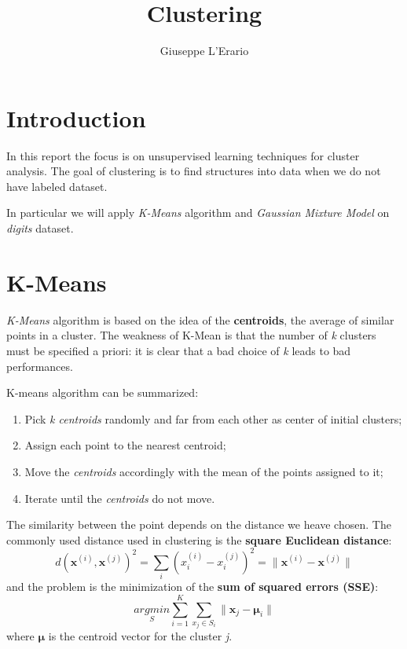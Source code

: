 \documentclass[10pt,a4paper]{article}
\author{Giuseppe L'Erario}
\date{}
\title{Clustering}
\begin{document}
\maketitle

\section*{Introduction}

In this report the focus is on unsupervised learning techniques for cluster analysis. The goal of clustering is to find structures into data when we do not have labeled dataset. 

In particular we will apply \emph{K-Means} algorithm and \emph{Gaussian Mixture Model} on \emph{digits} dataset.

\section{K-Means}
\emph{K-Means} algorithm is based on the idea of the \textbf{centroids}, the average of similar points in a cluster. The weakness of K-Mean is that the number of \emph{k} clusters must be specified a priori: it is clear that a bad choice of \emph{k} leads to bad performances.

K-means algorithm can be summarized:
\begin{enumerate}[leftmargin=3\parindent]
	\item Pick \emph{k centroids} randomly and far from each other as center of initial clusters;
	\item Assign each point to the nearest centroid;
	\item Move the \emph{centroids} accordingly with the mean of the points assigned to it;
	\item Iterate until the \emph{centroids} do not move.
\end{enumerate}

The similarity between the point depends on the distance we heave chosen. The commonly used distance used in clustering is the \textbf{square Euclidean distance}:
\begin{equation}
d(\mathbf{x}^{(i)},\mathbf{x}^{(j)})^2=\sum_{i}(x_i^{(i)}-x_i^{(j)})^2=\|\mathbf{x}^{(i)}-\mathbf{x}^{(j)}\|
\end{equation}
and the problem is the minimization of the \textbf{sum of squared errors (SSE)}:
\begin{equation}
\underset{S}{argmin} \sum_{i=1}^{K} \sum_{x_j \in S_i} \|\mathbf{x}_j-\boldsymbol{\mu}_i\|
\end{equation}
where $\boldsymbol{\mu}$ is the centroid vector for the cluster \emph{j}. \\
\end{document}
